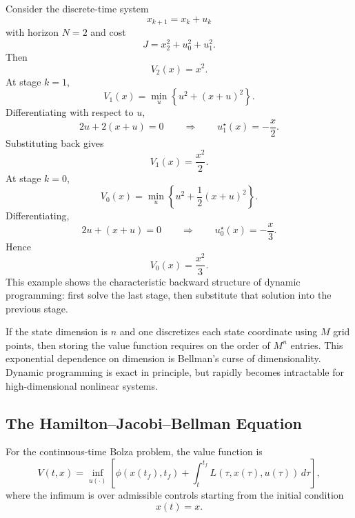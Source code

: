 \begin{eg}
	Consider the discrete-time system
	\[
		x_{k+1}=x_k+u_k
	\]
	with horizon $N=2$ and cost
	\[
		J=x_2^2+u_0^2+u_1^2.
	\]
	Then
	\[
		V_2(x)=x^2.
	\]
	At stage $k=1$,
	\[
		V_1(x)=\min_u \left\{u^2+(x+u)^2\right\}.
	\]
	Differentiating with respect to $u$,
	\[
		2u+2(x+u)=0
		\qquad \Longrightarrow \qquad
		u_1^\star(x)=-\frac{x}{2}.
	\]
	Substituting back gives
	\[
		V_1(x)=\frac{x^2}{2}.
	\]
	At stage $k=0$,
	\[
		V_0(x)=\min_u \left\{u^2+\frac{1}{2}(x+u)^2\right\}.
	\]
	Differentiating,
	\[
		2u+(x+u)=0
		\qquad \Longrightarrow \qquad
		u_0^\star(x)=-\frac{x}{3}.
	\]
	Hence
	\[
		V_0(x)=\frac{x^2}{3}.
	\]
	This example shows the characteristic backward structure of dynamic programming: first solve the last stage, then substitute that solution into the previous stage.
\end{eg}

\begin{remark}
	If the state dimension is $n$ and one discretizes each state coordinate using $M$ grid points, then storing the value function requires on the order of $M^n$ entries. This exponential dependence on dimension is Bellman’s curse of dimensionality. Dynamic programming is exact in principle, but rapidly becomes intractable for high-dimensional nonlinear systems.
\end{remark}

\subsection{The Hamilton--Jacobi--Bellman Equation}
\label{sec:l4-the-hamilton-jacobi-bellman-equation}

\begin{definition}\label{def:l4-continuous-time-value-function}
	For the continuous-time Bolza problem, the value function is
	\[
		V(t,x)
		=
		\inf_{u(\cdot)}
		\left[
		\phi(x(t_f),t_f)+\int_t^{t_f} L(\tau,x(\tau),u(\tau))\,d\tau
		\right],
	\]
	where the infimum is over admissible controls starting from the initial condition
	\[
		x(t)=x.
	\]
\end{definition}

